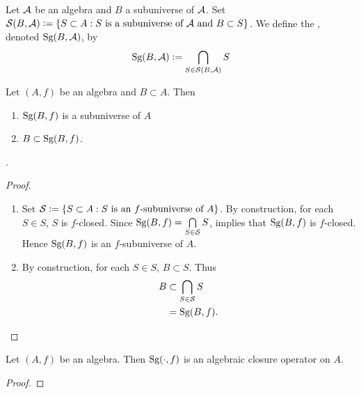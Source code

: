 \documentclass{book}
\begin{document}
	\begin{defn}
		Let $\mathcal{A}$ be an algebra and $B$ a subuniverse of $\mathcal{A}$. Set $\mathcal{S}(B, \mathcal{A}) \vcentcolon= \{S \subset A: \text{$S$ is a subuniverse of $\mathcal{A}$ and $B \subset S$}\}$. We define the , denoted $\operatorname*{\text{Sg}}(B, \mathcal{A})$, by
		$$\operatorname*{\text{Sg}}(B, \mathcal{A}) \vcentcolon= \bigcap\limits_{S \in \mathcal{S}(B, \mathcal{A})} S $$
	\end{defn}

	\begin{ex}
		Let $(A, f)$ be an algebra and $B \subset A$. Then 
		\begin{enumerate}
			\item $\operatorname*{\text{Sg}}(B, f)$ is a subuniverse of $A$
			\item $B \subset \operatorname*{\text{Sg}}(B, f)$.
		\end{enumerate}.
	\end{ex}

	\begin{proof}\
		\begin{enumerate}
			\item Set $\mathcal{S} \vcentcolon= \{S \subset A: \text{$S$ is an $f$-subuniverse of $A$}\}$. By construction, for each $S \in S$, $S$ is $f$-closed. Since $\operatorname*{\text{Sg}}(B, f) = \bigcap\limits_{S \in \mathcal{S}} S$, \rex{}  implies that $\operatorname*{\text{Sg}}(B, f)$ is $f$-closed. Hence $\operatorname*{\text{Sg}}(B, f)$ is an $f$-subuniverse of $A$. 
			\item By construction, for each $S \in S$, $B \subset S$. Thus
			\begin{align*}
				B
				& \subset \bigcap\limits_{S \in \mathcal{S}} S \\
				& = \operatorname*{\text{Sg}}(B, f).
			\end{align*}
		\end{enumerate}
	\end{proof}

	\begin{ex}
		Let $(A, f)$ be an algebra. Then $\operatorname*{\text{Sg}}(\cdot, f)$ is an algebraic closure operator on $A$.
	\end{ex}

	\begin{proof}
		
	\end{proof}

	

	

	
\end{document}
